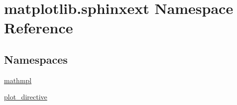 \hypertarget{namespacematplotlib_1_1sphinxext}{}\section{matplotlib.\+sphinxext Namespace Reference}
\label{namespacematplotlib_1_1sphinxext}
\subsection*{Namespaces}
\begin{DoxyCompactItemize}
\item 
 \hyperlink{namespacematplotlib_1_1sphinxext_1_1mathmpl}{mathmpl}
\item 
 \hyperlink{namespacematplotlib_1_1sphinxext_1_1plot__directive}{plot\+\_\+directive}
\end{DoxyCompactItemize}
